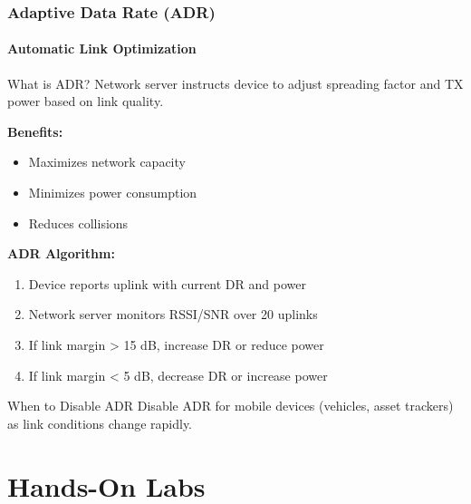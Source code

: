 \documentclass{beamer}
\begin{document}
\begin{frame}[fragile]
\frametitle{Adaptive Data Rate (ADR)}
\framesubtitle{Automatic Link Optimization}

\begin{block}{What is ADR?}
Network server instructs device to adjust spreading factor and TX power based on link quality.
\end{block}

\textbf{Benefits:}
\begin{itemize}
    \item Maximizes network capacity
    \item Minimizes power consumption
    \item Reduces collisions
\end{itemize}

\textbf{ADR Algorithm:}
\begin{enumerate}
    \item Device reports uplink with current DR and power
    \item Network server monitors RSSI/SNR over 20 uplinks
    \item If link margin > 15 dB, increase DR or reduce power
    \item If link margin < 5 dB, decrease DR or increase power
\end{enumerate}

\begin{exampleblock}{When to Disable ADR}
Disable ADR for mobile devices (vehicles, asset trackers) as link conditions change rapidly.
\end{exampleblock}
\end{frame}

\section{Hands-On Labs}
\end{document}
